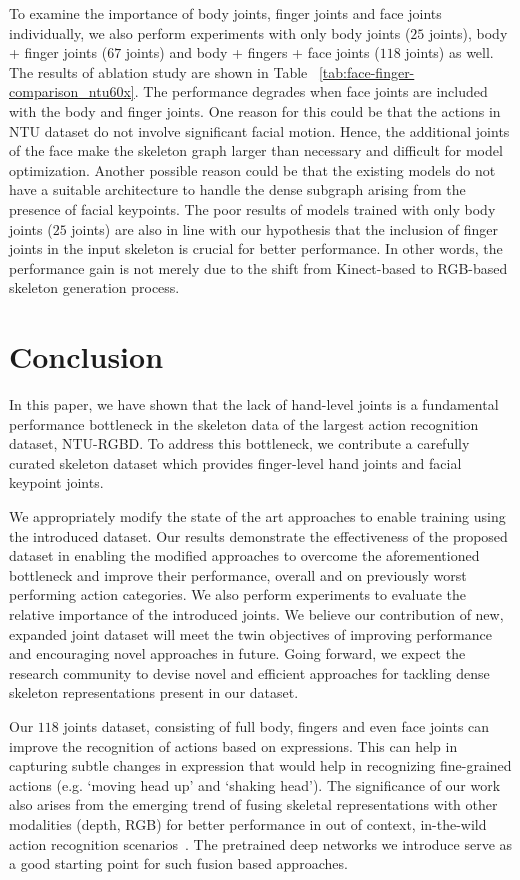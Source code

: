 \documentclass[sigconf,screen,prologue,table,dvipsnames]{acmart}
\begin{document}
To examine the importance of body joints, finger joints and face joints individually, we also perform experiments with only body joints ($25$ joints), body + finger joints ($67$ joints) and body + fingers + face joints ($118$ joints) as well. The results of ablation study are shown in Table ~\ref{tab:face-finger-comparison_ntu60x}. The performance degrades when face joints are included with the body and finger joints. One reason for this could be that the actions in NTU dataset do not involve significant facial motion. Hence, the additional joints of the face make the skeleton graph larger than necessary and difficult for model optimization. Another possible reason could be that the existing models do not have a suitable architecture to handle the dense subgraph arising from the presence of facial keypoints. The poor results of models trained with only body joints ($25$ joints) are also in line with our hypothesis that the inclusion of finger joints in the input skeleton is crucial for better performance. In other words, the performance gain is not merely due to the shift from Kinect-based to RGB-based skeleton generation process.

\section{Conclusion}
\label{sec:conclusion}

In this paper, we have shown that the lack of hand-level joints is a fundamental performance bottleneck in the skeleton data of the largest action recognition dataset, NTU-RGBD. To address this bottleneck, we contribute a carefully curated skeleton dataset which provides finger-level hand joints and facial keypoint joints. 

We appropriately modify the state of the art approaches to enable training using the introduced dataset. Our results demonstrate the effectiveness of the proposed dataset in enabling the modified approaches to overcome the aforementioned bottleneck and improve their performance, overall and on previously worst performing action categories. We also perform experiments to evaluate the relative importance of the introduced joints. We believe our contribution of new, expanded joint dataset will meet the twin objectives of improving performance and encouraging novel approaches in future. Going forward, we expect the research community to devise novel and efficient approaches for tackling dense skeleton representations present in our dataset. 

Our $118$ joints dataset, consisting of full body, fingers and even face joints can improve the recognition of actions based on expressions. This can help in capturing subtle changes in expression that would help in recognizing fine-grained actions (e.g. `moving head up' and `shaking head'). The significance of our work also arises from the emerging trend of fusing skeletal representations with other modalities (depth, RGB) for better performance in out of context, in-the-wild action recognition scenarios~\cite{mimetics, Gupta2021, moon2021integralaction}. The pretrained deep networks we introduce serve as a good starting point for such fusion based approaches.
\end{document}
